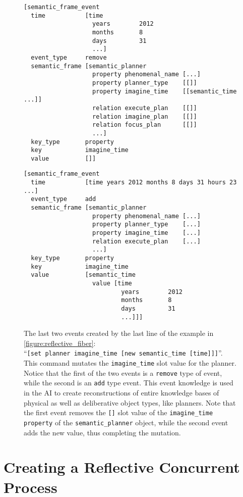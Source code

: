 \begin{figure}[h]
\centering
{\small
\begin{Verbatim}[frame=single]
[semantic_frame_event
  time           [time
                   years        2012
                   months       8
                   days         31
                   ...]
  event_type     remove
  semantic_frame [semantic_planner
                   property phenomenal_name [...]
                   property planner_type    [[]]
                   property imagine_time    [[semantic_time ...]]
                   relation execute_plan    [[]]
                   relation imagine_plan    [[]]
                   relation focus_plan      [[]]
                   ...]
  key_type       property
  key            imagine_time
  value          []]
\end{Verbatim}
\begin{Verbatim}[frame=single]
[semantic_frame_event
  time           [time years 2012 months 8 days 31 hours 23 ...]
  event_type     add
  semantic_frame [semantic_planner
                   property phenomenal_name [...]
                   property planner_type    [...]
                   property imagine_time    [...]
                   relation execute_plan    [...]
                   ...]
  key_type       property
  key            imagine_time
  value          [semantic_time
                   value [time
                           years        2012
                           months       8
                           days         31
                           ...]]]
\end{Verbatim}
}
\caption[The last two events created by the last line of the example
  in {\mbox{\autoref{figure:reflective_fiber}}}.]{The last two events
  created by the last line of the example in
  {\mbox{\autoref{figure:reflective_fiber}}}:
  ``{\tt{[set~planner~imagine\_time~[new~semantic\_time~[time]]]}}''. This
  command mutates the {\tt{imagine\_time}} slot value for the planner.
  Notice that the first of the two events is a {\tt{remove}} type of
  event, while the second is an {\tt{add}} type event.  This event
  knowledge is used in the AI to create reconstructions of entire
  knowledge bases of physical as well as deliberative object types,
  like planners.  Note that the first event removes the {\tt{[]}} slot
  value of the {\tt{imagine\_time}} {\tt{property}} of the
  {\tt{semantic\_planner}} object, while the second event adds the new
  value, thus completing the mutation.}
\label{figure:remove_add_set_events}
\end{figure}

\section{Creating a Reflective Concurrent Process}

